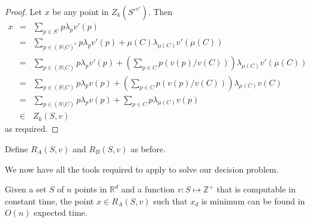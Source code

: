 \documentclass[lotsofwhite]{patmorin}
\newcommand{\R}{\mathbb{R}}
\begin{document}
\begin{proof}
Let $x$ be any point in $Z_k(S'^{v'})$.  Then
\begin{eqnarray*}
    x &=& \sum_{p\in S'} p\lambda_pv'(p) \\
      &=& \sum_{p\in (S\setminus C)^v} p\lambda_pv'(p) 
          + \mu(C)\lambda_{\mu(C)}v'(\mu(C)) \\
      &=& \sum_{p\in (S\setminus C)} p\lambda_p v'(p) 
          + \left(\sum_{p\in C} p(v(p)/v(C))\right)
             \lambda_{\mu(C)}v'(\mu(C))\\
      &=& \sum_{p\in (S\setminus C)} p\lambda_p v(p) 
          + \left(\sum_{p\in C} p(v(p)/v(C))\right)
             \lambda_{\mu(C)}v(C)\\
      &=& \sum_{p\in (S\setminus C)} p\lambda_p v(p) 
          + \sum_{p\in C} p\lambda_{\mu(C)}v(p) \\
      &\in& Z_k(S,v)
\end{eqnarray*}
as required.
\end{proof}

Define $R_A(S,v)$ and $R_B(S,v)$ as before.

We now have all the tools required to apply  to solve our
decision problem.

\begin{thm}
Given a set $S$ of $n$ points in $\R^d$ and a 
function $v:S\mapsto\mathbb{Z}^+$ that is computable in constant
time, the point $x\in R_A(S,v)$ such
that $x_d$ is minimum can be found in $O(n)$ expected
time.
\end{thm}
\end{document}
